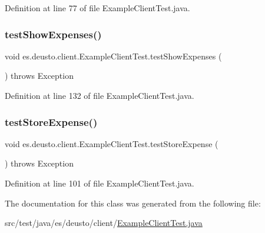 Definition at line 77 of file Example\+Client\+Test.\+java.

\mbox{\label{classes_1_1deusto_1_1client_1_1_example_client_test_adedccf184289eaf6d6cc3f53a2fdc621}} 
\subsubsection{\texorpdfstring{test\+Show\+Expenses()}{testShowExpenses()}}
{\footnotesize\ttfamily void es.\+deusto.\+client.\+Example\+Client\+Test.\+test\+Show\+Expenses (\begin{DoxyParamCaption}{ }\end{DoxyParamCaption}) throws Exception}



Definition at line 132 of file Example\+Client\+Test.\+java.

\mbox{\label{classes_1_1deusto_1_1client_1_1_example_client_test_ad8b31f30dcc49c24a0473d59f0c8d9ef}} 
\subsubsection{\texorpdfstring{test\+Store\+Expense()}{testStoreExpense()}}
{\footnotesize\ttfamily void es.\+deusto.\+client.\+Example\+Client\+Test.\+test\+Store\+Expense (\begin{DoxyParamCaption}{ }\end{DoxyParamCaption}) throws Exception}



Definition at line 101 of file Example\+Client\+Test.\+java.



The documentation for this class was generated from the following file\+:\begin{DoxyCompactItemize}
\item 
src/test/java/es/deusto/client/\hyperlink{_example_client_test_8java}{Example\+Client\+Test.\+java}\end{DoxyCompactItemize}
